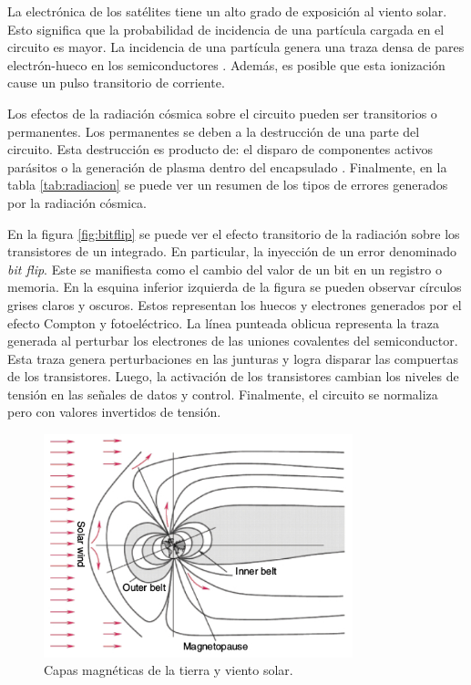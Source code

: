 La electrónica de los satélites tiene un alto grado de exposición al viento solar.
Esto significa que la probabilidad de incidencia de una partícula cargada en el circuito es mayor.
La incidencia de una partícula genera una traza densa de pares electrón-hueco en los semiconductores \citep{ARTICLE:velazco}.
Además, es posible que esta ionización cause un pulso transitorio de corriente.

Los efectos de la radiación cósmica sobre el circuito pueden ser transitorios o permanentes.
Los permanentes se deben a la destrucción de una parte del circuito.
Esta destrucción es producto de: el disparo de componentes activos parásitos o la generación de plasma dentro del encapsulado \citep{WEBSITE:effects_on_devices}.
Finalmente, en la tabla \ref{tab:radiacion} se puede ver un resumen de los tipos de errores generados por la radiación cósmica.

En la figura \ref{fig:bitflip} se puede ver el efecto transitorio de la radiación sobre los transistores de un integrado.
En particular, la inyección de un error denominado \emph{bit flip}.
Este se manifiesta como el cambio del valor de un bit en un registro o memoria.
En la esquina inferior izquierda de la figura se pueden observar círculos grises claros y oscuros.
Estos representan los huecos y electrones generados por el efecto Compton y fotoeléctrico.
La línea punteada oblicua representa la traza generada al perturbar los electrones de las uniones covalentes del semiconductor.
Esta traza genera perturbaciones en las junturas y logra disparar las compuertas de los transistores.
Luego, la activación de los transistores cambian los niveles de tensión en las señales de datos y control.
Finalmente, el circuito se normaliza pero con valores invertidos de tensión.

\begin{figure}[htbp]
	\centering
	\includegraphics[width=0.8\textwidth]{./Figures/vientosolar.jpg}
    \caption{Capas magnéticas de la tierra y viento solar\protect\footnotemark.}
	\label{fig:viento}
\end{figure}

